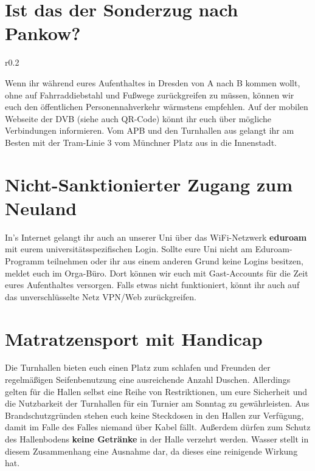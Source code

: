 \section*{Ist das der Sonderzug nach Pankow?}

\begin{wrapfigure}{r}{0.2\textwidth}
  \vspace*{-11pt}
  \textcolor{KIFgrey}{} \\
\end{wrapfigure}

Wenn ihr während eures Aufenthaltes in Dresden von A nach B kommen wollt, ohne auf Fahrraddiebstahl und Fußwege zurückgreifen zu müssen, können wir euch den öffentlichen Personennahverkehr wärmstens empfehlen.
Auf der mobilen Webseite der DVB  (siehe auch QR-Code) könnt ihr euch über mögliche Verbindungen informieren.
Vom APB und den Turnhallen aus gelangt ihr am Besten mit der Tram-Linie 3 vom Münchner Platz aus in die Innenstadt.

\section*{Nicht-Sanktionierter Zugang zum Neuland}

In's Internet gelangt ihr auch an unserer Uni über das WiFi-Netzwerk \textbf{eduroam} mit eurem universitätsspezifischen Login.
Sollte eure Uni nicht am Eduroam-Programm teilnehmen oder ihr aus einem anderen Grund keine Logins besitzen, meldet euch im Orga-Büro.
Dort können wir euch mit Gast-Accounts für die Zeit eures Aufenthaltes versorgen.
Falls etwas nicht funktioniert, könnt ihr auch auf das unverschlüsselte Netz VPN/Web zurückgreifen.

\section*{Matratzensport mit Handicap}

Die Turnhallen bieten euch einen Platz zum schlafen und Freunden der regelmäßigen Seifenbenutzung eine ausreichende Anzahl Duschen.
Allerdings gelten für die Hallen selbst eine Reihe von Restriktionen, um eure Sicherheit und die Nutzbarkeit der Turnhallen für ein Turnier am Sonntag zu gewährleisten.
Aus Brandschutzgründen stehen euch keine Steckdosen in den Hallen zur Verfügung, damit im Falle des Falles niemand über Kabel fällt.
Außerdem dürfen zum Schutz des Hallenbodens \textbf{keine Getränke} in der Halle verzehrt werden.
Wasser stellt in diesem Zusammenhang eine Ausnahme dar, da dieses eine reinigende Wirkung hat.

